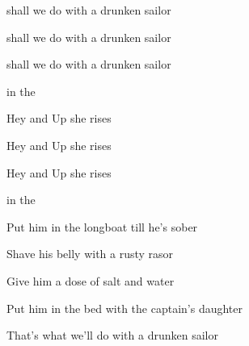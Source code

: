 \begin{SBVerse*}
 shall we do with a drunken sailor

 shall we do with a drunken sailor

 shall we do with a drunken sailor

 in the 
\end{SBVerse*}

\bigskip

\begin{SBChorus}
 Hey and Up she rises

 Hey and Up she rises

 Hey and Up she rises

 in the 
\end{SBChorus}

\bigskip

Put him in the longboat till he's sober

\bigskip

Shave his belly with a rusty rasor

\bigskip

Give him a dose of salt and water

\bigskip

Put him in the bed with the captain's daughter

\bigskip

That's what we'll do with a drunken sailor

